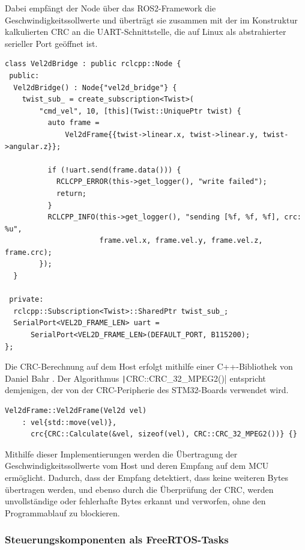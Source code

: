 Dabei empfängt der Node über das ROS2-Framework die Geschwindigkeitssollwerte
und überträgt sie zusammen mit der im Konstruktur kalkulierten CRC an die
UART-Schnittstelle, die auf Linux als abstrahierter serieller Port geöffnet ist.

\begin{code}
\begin{verbatim}
class Vel2dBridge : public rclcpp::Node {
 public:
  Vel2dBridge() : Node{"vel2d_bridge"} {
    twist_sub_ = create_subscription<Twist>(
        "cmd_vel", 10, [this](Twist::UniquePtr twist) {
          auto frame =
              Vel2dFrame{{twist->linear.x, twist->linear.y, twist->angular.z}};

          if (!uart.send(frame.data())) {
            RCLCPP_ERROR(this->get_logger(), "write failed");
            return;
          }
          RCLCPP_INFO(this->get_logger(), "sending [%f, %f, %f], crc: %u",
                      frame.vel.x, frame.vel.y, frame.vel.z, frame.crc);
        });
  }

 private:
  rclcpp::Subscription<Twist>::SharedPtr twist_sub_;
  SerialPort<VEL2D_FRAME_LEN> uart =
      SerialPort<VEL2D_FRAME_LEN>(DEFAULT_PORT, B115200);
};
\end{verbatim}
\end{code}

Die CRC-Berechnung auf dem Host erfolgt mithilfe einer C++-Bibliothek von Daniel
Bahr \cite{CRCpp}. Der Algorithmus \texttt|CRC::CRC_32_MPEG2()|
entspricht demjenigen, der von der CRC-Peripherie des STM32-Boards verwendet
wird.

\begin{code}
\begin{verbatim}
Vel2dFrame::Vel2dFrame(Vel2d vel)
    : vel{std::move(vel)},
      crc{CRC::Calculate(&vel, sizeof(vel), CRC::CRC_32_MPEG2())} {}
\end{verbatim}
\end{code}

Mithilfe dieser Implementierungen werden die Übertragung der
Geschwindigkeitssollwerte vom Host und deren Empfang auf dem MCU ermöglicht.
Dadurch, dass der Empfang detektiert, dass keine weiteren Bytes übertragen
werden, und ebenso durch die Überprüfung der CRC, werden unvollständige oder
fehlerhafte Bytes erkannt und verworfen, ohne den Programmablauf zu blockieren.

\subsubsection{Steuerungskomponenten als FreeRTOS-Tasks}

